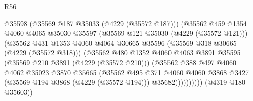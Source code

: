\begin{lexlean}{R56}
\begin{coremodule}
                                            @35598
                                            (@35569 @187 @35033 (@4229 (@35572 @187)))
                                            (@35562
                                              @459
                                              @1354
                                              @4060
                                              @4065
                                              @35030
                                              @35597
                                              (@35569 @121 @35030 (@4229 (@35572 @121)))
                                              (@35562
                                                @431
                                                @1353
                                                @4060
                                                @4064
                                                @30665
                                                @35596
                                                (@35569 @318 @30665 (@4229 (@35572 @318)))
                                                (@35562
                                                  @480
                                                  @1352
                                                  @4060
                                                  @4063
                                                  @3891
                                                  @35595
                                                  (@35569 @210 @3891 (@4229 (@35572 @210)))
                                                  (@35562
                                                    @388
                                                    @497
                                                    @4060
                                                    @4062
                                                    @35023
                                                    @3870
                                                    @35665
                                                    (@35562
                                                      @495
                                                      @371
                                                      @4060
                                                      @4060
                                                      @3868
                                                      @3427
                                                      (@35569 @194 @3868 (@4229 (@35572 @194)))
                                                      @35682))))))))))
                                  (@4319 @180 @35603))

\end{coremodule}
\end{lexlean}
